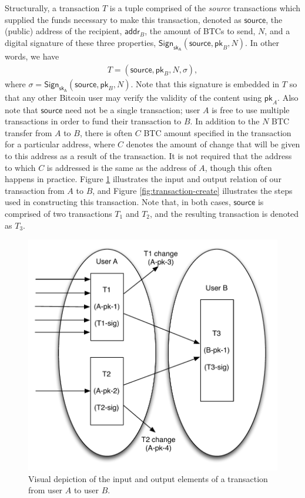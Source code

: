 Structurally, a transaction $T$ is a tuple comprised of the \emph{source} transactions which supplied the funds necessary to make this transaction, denoted as $\mathsf{source}$, the (public) address of the recipient, $\mathsf{addr}_B$, the amount of BTCs to send, $N$, and a digital signature of these three properties, $\mathsf{Sign}_{\mathsf{sk_A}}({\mathsf{source}, \mathsf{pk}_B, N})$. In other words, we have 
\begin{align*}
T = (\mathsf{source}, \mathsf{pk}_B, N, \sigma), 
\end{align*}
where $\sigma = \mathsf{Sign}_{\mathsf{sk_A}}({\mathsf{source}, \mathsf{pk}_B, N})$. Note that this signature is embedded in $T$ so that any other Bitcoin user may verify the validity of the content using $\mathsf{pk}_A$. Also note that $\mathsf{source}$ need not be a single transaction; user $A$ is free to use multiple transactions in order to fund their transaction to $B$. In addition to the $N$ BTC transfer from $A$ to $B$, there is often $C$ BTC amount specified in the transaction for a particular address, where $C$ denotes the amount of change that will be given to this address as a result of the transaction. It is not required that the address to which $C$ is addressed is the same as the address of $A$, though this often happens in practice. Figure \ref{fig:transaction-io} illustrates the input and output relation of our transaction from $A$ to $B$, and Figure \ref{fig:transaction-create} illustrates the steps used in constructing this transaction. Note that, in both cases, $\mathsf{source}$ is comprised of two transactions $T_1$ and $T_2$, and the resulting transaction is denoted as $T_3$.

\begin{center}
\begin{figure}
\includegraphics[scale=0.5]{./images/transaction_io.pdf}
\caption{Visual depiction of the input and output elements of a transaction from user $A$ to user $B$.}
\label{fig:transaction-io}
\end{figure}
\end{center}

